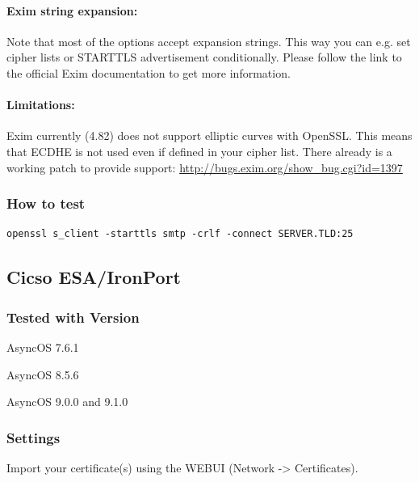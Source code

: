 \paragraph{Exim string expansion:}
Note that most of the options accept expansion strings. This way you can e.g. set cipher lists or STARTTLS advertisement conditionally. Please follow the link to the official Exim documentation to get more information.

\paragraph{Limitations:}
Exim currently (4.82) does not support elliptic curves with OpenSSL. This means that ECDHE is not used even if defined in your cipher list.
There already is a working patch to provide support:
\url{http://bugs.exim.org/show_bug.cgi?id=1397}

\subsubsection{How to test}
\begin{lstlisting}
openssl s_client -starttls smtp -crlf -connect SERVER.TLD:25
\end{lstlisting}




\subsection{Cicso ESA/IronPort}
\subsubsection{Tested with Version}
\begin{itemize*}
  \item AsyncOS 7.6.1
  \item AsyncOS 8.5.6
  \item AsyncOS 9.0.0 and 9.1.0
\end{itemize*}

\subsubsection{Settings}
Import your certificate(s) using the WEBUI (Network -> Certificates).

